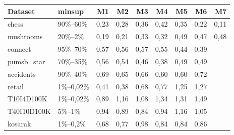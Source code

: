 \begin{tabular}{llrrrrrrr}
\hline
Dataset & minsup & M1 & M2 & M3 & M4 & M5 & M6 & M7 \\
\hline
chess & 90\%–60\% & 0,23 & 0,28 & 0,36 & 0,42 & 0,35 & 0,22 & 0,11 \\
mushrooms & 20\%–2\% & 0,19 & 0,21 & 0,33 & 0,32 & 0,49 & 0,47 & 0,48 \\
connect & 95\%–70\% & 0,57 & 0,56 & 0,57 & 0,55 & 0,44 & 0,39 &  \\
pumsb\_star & 70\%–35\% & 0,56 & 0,54 & 0,46 & 0,38 & 0,49 & 0,49 &  \\
accidents & 90\%–40\% & 0,69 & 0,65 & 0,66 & 0,60 & 0,60 & 0,72 &  \\
retail & 1\%–0,02\% & 0,41 & 0,38 & 0,68 & 0,77 & 1,25 & 1,27 &  \\
T10I4D100K & 1\%–0,02\% & 0,89 & 1,16 & 1,08 & 1,34 & 1,31 & 1,49 &  \\
T40I10D100K & 5\%–1\% & 0,94 & 0,89 & 0,84 & 0,94 & 1,16 & 1,05 &  \\
kosarak & 1\%–0,2\% & 0,68 & 0,77 & 0,98 & 0,84 & 0,84 & 0,86 &  \\
\hline
\end{tabular}
